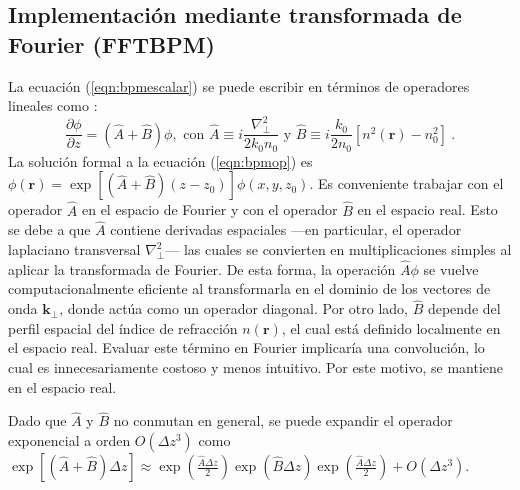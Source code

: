 \subsection{Implementación mediante transformada de Fourier (FFTBPM)}
La ecuación (\ref{eqn:bpmescalar}) se puede escribir en términos de operadores lineales como \citep{bpm}: 
\begin{equation}
	\frac{\partial \phi}{\partial z}  = \left(\hat{A} + \hat{B}\right)\phi, \text{ con } \hat{A} \equiv i\frac{\nabla^2_\perp}{2k_0n_0}\text{ y } \hat{B} \equiv i\frac{k_0}{2n_0}\left[n^2(\textbf{r})-n_0^2\right] \ . \label{eqn:bpmop}
\end{equation}
La solución formal a la ecuación (\ref{eqn:bpmop}) es $\phi(\textbf{r}) = \exp\left[\left(\hat{A} + \hat{B}\right)(z-z_0)\right]\phi(x, y, z_0)$. Es conveniente trabajar con el operador \( \hat{A} \) en el espacio de Fourier y con el operador \( \hat{B} \) en el espacio real. Esto se debe a que \( \hat{A} \) contiene derivadas espaciales —en particular, el operador laplaciano transversal \( \nabla^2_\perp \)— las cuales se convierten en multiplicaciones simples al aplicar la transformada de Fourier. De esta forma, la operación \( \hat{A} \phi \) se vuelve computacionalmente eficiente al transformarla en el dominio de los vectores de onda \( \textbf{k}_\perp \), donde actúa como un operador diagonal. Por otro lado, \( \hat{B} \) depende del perfil espacial del índice de refracción \( n(\textbf{r}) \), el cual está definido localmente en el espacio real. Evaluar este término en Fourier implicaría una convolución, lo cual es innecesariamente costoso y menos intuitivo. Por este motivo, se mantiene en el espacio real. 

Dado que $\hat{A}$ y $\hat{B}$ no conmutan en general, se puede expandir el operador exponencial a orden $O(\Delta z ^3)$ como $\exp\left[\left(\hat{A} + \hat{B}\right)\Delta z \right] \approx \exp\left(\frac{\hat{A}\Delta z}{2} \right)\exp\left(\hat{B}\Delta z \right)\exp\left(\frac{\hat{A}\Delta z}{2} \right) + O(\Delta z ^3)$.

